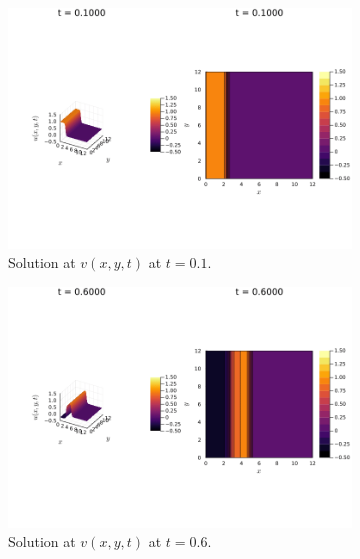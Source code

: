 \documentclass[12pt]{report}
\begin{document}
\begin{solution}
\begin{figure}[H]
    \begin{subfigure}[b]{0.45\linewidth}
        \centering
        \includegraphics[width=\linewidth]{images/6-1-10.png}
        \caption{Solution at $v(x,y,t)$ at $t=0.1$.}
        \label{6-1:a}
        \vspace{4ex}
    \end{subfigure}%
    \begin{subfigure}[b]{0.45\linewidth}
        \centering
        \includegraphics[width=\linewidth]{images/6-1-60.png}
        \caption{Solution at $v(x,y,t)$ at $t=0.6$.}
        \label{6-1:b}
        \vspace{4ex}
    \end{subfigure}
    \begin{subfigure}[b]{0.45\linewidth}

\end{subfigure}
\end{figure}
\end{solution}
\end{document}
